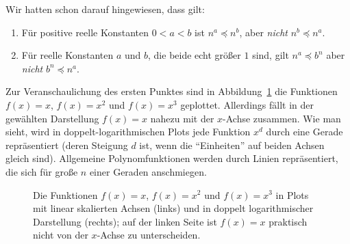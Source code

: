 Wir hatten schon darauf hingewiesen, dass gilt:
\begin{enumerate}
\item Für positive reelle Konstanten $0<a<b$ ist $n^a\preceq n^b$,
  aber \emph{nicht} $n^b\preceq n^a$.
\item Für reelle Konstanten $a$ und $b$, die beide echt größer $1$
  sind, gilt $n^a \preceq b^n$ aber \emph{nicht} $b^n\preceq n^a$.
\end{enumerate}
%
Zur Veranschaulichung des ersten Punktes sind in
Abbildung~\ref{fig:wachstum-polynome} die Funktionen $f(x)=x$,
$f(x)=x^2$ und $f(x)=x^3$ geplottet. Allerdings fällt in der gewählten
Darstellung $f(x)=x$ nahezu mit der $x$-Achse zusammen. Wie man sieht,
wird in doppelt-logarithmischen Plots jede Funktion $x^d$ durch eine
Gerade repräsentiert (deren Steigung $d$ ist, wenn die "`Einheiten"'
auf beiden Achsen gleich sind). Allgemeine Polynomfunktionen werden
durch Linien repräsentiert, die sich für große $n$ einer Geraden
anschmiegen.

\begin{figure}[ht]
  \centering
  \hspace{5mm}

  \caption{Die Funktionen $f(x)=x$, $f(x)=x^2$ und $f(x)=x^3$ in Plots
    mit linear skalierten Achsen (links) und in doppelt
    logarithmischer Darstellung (rechts); auf der linken Seite ist
    $f(x)=x$ praktisch nicht von der $x$-Achse zu unterscheiden.}
\label{fig:wachstum-polynome}
\end{figure}

